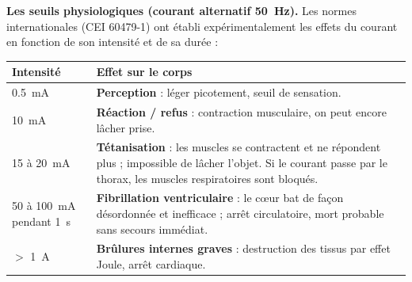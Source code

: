 \documentclass[11pt]{article}
\begin{document}
\textbf{Les seuils physiologiques (courant alternatif \SI{50}{Hz}).} Les normes internationales (CEI 60479-1) ont établi expérimentalement les effets du courant en fonction de son intensité et de sa durée :

\begin{center}
\begin{tabularx}{\linewidth}{|l|X|}
\hline
\rowcolor{popblueL} \textbf{Intensité} & \textbf{Effet sur le corps} \\
\hline
\SI{0,5}{mA} & \textbf{Perception} : léger picotement, seuil de sensation. \\
\hline
\SI{10}{mA} & \textbf{Réaction / refus} : contraction musculaire, on peut encore lâcher prise. \\
\hline
15 à \SI{20}{mA} & \textbf{Tétanisation} : les muscles se contractent et ne répondent plus ; impossible de lâcher l'objet. Si le courant passe par le thorax, les muscles respiratoires sont bloqués. \\
\hline
50 à \SI{100}{mA} pendant \SI{1}{s} & \textbf{Fibrillation ventriculaire} : le cœur bat de façon désordonnée et inefficace ; arrêt circulatoire, mort probable sans secours immédiat. \\
\hline
$>$ \SI{1}{A} & \textbf{Brûlures internes graves} : destruction des tissus par effet Joule, arrêt cardiaque. \\
\hline
\end{tabularx}
\end{center}
\end{document}

